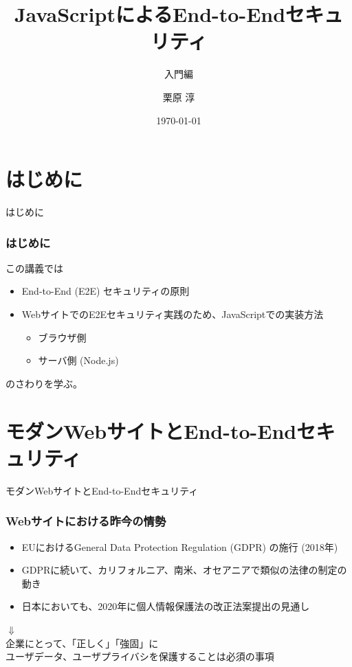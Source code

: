 \documentclass[12pt,dvipdfmx]{beamer}
\title[E2E Security with JS]{JavaScriptによるEnd-to-Endセキュリティ}
\subtitle{入門編}
\author[Jun Kurihara]{栗原 淳}
\institute[]{}
\date[\today]{\today}
\begin{document}
\begin{frame}
\titlepage
\end{frame}

\section{はじめに}
\begin{frame}
 \centering
 {\Large はじめに}
\end{frame}
\begin{frame}
\frametitle{はじめに}
この講義では
\begin{itemize}
 \item End-to-End (E2E) セキュリティの原則
 \item WebサイトでのE2Eセキュリティ実践のため、JavaScriptでの実装方法
\begin{itemize}
 \item ブラウザ側
 \item サーバ側 (Node.js)
\end{itemize}
\end{itemize}
のさわりを学ぶ。

\end{frame}

\section{モダンWebサイトとEnd-to-Endセキュリティ}
\begin{frame}
 \centering
 {\Large モダンWebサイトとEnd-to-Endセキュリティ}
\end{frame}

\begin{frame}
\frametitle{Webサイトにおける昨今の情勢}
\begin{itemize}
\item EUにおけるGeneral Data Protection Regulation (GDPR) の施行 (2018年)\\
\item GDPRに続いて、カリフォルニア、南米、オセアニアで類似の法律の制定の動き\\
\item 日本においても、2020年に個人情報保護法の改正法案提出の見通し
\end{itemize}
\begin{center}
$\Downarrow$\\
\alert{企業にとって、「正しく」「強固」に\\
ユーザデータ、ユーザプライバシを保護することは必須の事項}
\end{center}
\end{frame}
\end{document}
